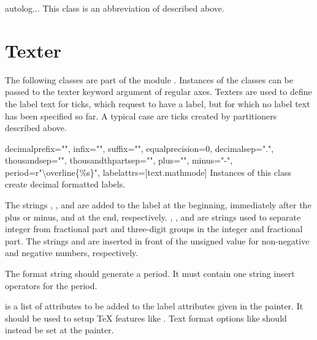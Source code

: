 \begin{classdesc}{autolog}{...}
This class is an abbreviation of  described above.
\end{classdesc}

\section{Texter}


The following classes are part of the module .
Instances of the classes can be passed to the texter keyword argument
of regular axes. Texters are used to define the label text for ticks,
which request to have a label, but for which no label text has been specified
so far. A typical case are ticks created by partitioners described
above.

\begin{classdesc}{decimal}{prefix="", infix="", suffix="", equalprecision=0,
                           decimalsep=".", thousandsep="", thousandthpartsep="",
                           plus="", minus="-", period=r"\textbackslash overline\{\%s\}",
                           labelattrs=[text.mathmode]}
  Instances of this class create decimal formatted labels.

  The strings , , and  are added to
  the label at the beginning, immediately after the plus or minus, and at
  the end, respectively. , , and
   are strings used to separate integer from
  fractional part and three-digit groups in the integer and fractional
  part. The strings  and  are inserted in front
  of the unsigned value for non-negative and negative numbers,
  respectively.

  The format string  should generate a period. It must
  contain one string insert operators  for the period.

   is a list of attributes to be added to the label
  attributes given in the painter. It should be used to setup \TeX{}
  features like . Text format options like
   should instead be set at the painter.
\end{classdesc}

